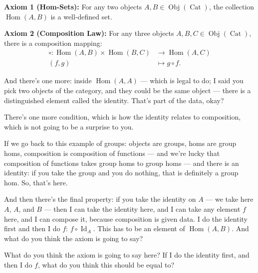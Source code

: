 \begin{content}
\textbf{Axiom 1 (Hom-Sets):} For any two objects $A, B \in \operatorname{Obj}(\operatorname{Cat})$, the collection $\operatorname{Hom}(A, B)$ is a well-defined set.

\textbf{Axiom 2 (Composition Law):} For any three objects $A, B, C \in \operatorname{Obj}(\operatorname{Cat})$, there is a composition mapping:
\begin{align*}
\circ \colon \operatorname{Hom}(A, B) \times \operatorname{Hom}(B, C) &\longrightarrow \operatorname{Hom}(A, C) \\
(f, g) &\longmapsto g \circ f.
\end{align*}
\end{content}

\begin{speech}[01:14:06 - 01:16:30]
And there's one more: inside $\operatorname{Hom}(A, A)$ ---  which is legal to do; I said you pick two objects of the category, and they could be the same object --- there is a distinguished element called the identity. That's part of the data, okay?

There's one more condition, which is how the identity relates to composition, which is not going to be a surprise to you.

If we go back to this example of groups: objects are groups, homs are group homs, composition is composition of functions --- and we're lucky that composition of functions takes group homs to group homs --- and there is an identity: if you take the group and you do nothing, that is definitely a group hom. So, that's here.

And then there's the final property: if you take the identity on $A$ --- we take here $A$, $A$, and $B$  --- then I can take the identity here,  and I can take any element $f$ here,  and I can compose it, because composition is given data. I do the identity first and then I do $f$: $f \circ \operatorname{Id}_A$.  This has to be an element of $\operatorname{Hom}(A, B)$.  And what do you think the axiom is going to say?

What do you think the axiom is going to say here? If I do the identity first, and then I do $f$, what do you think this should be equal to?


\end{speech}
